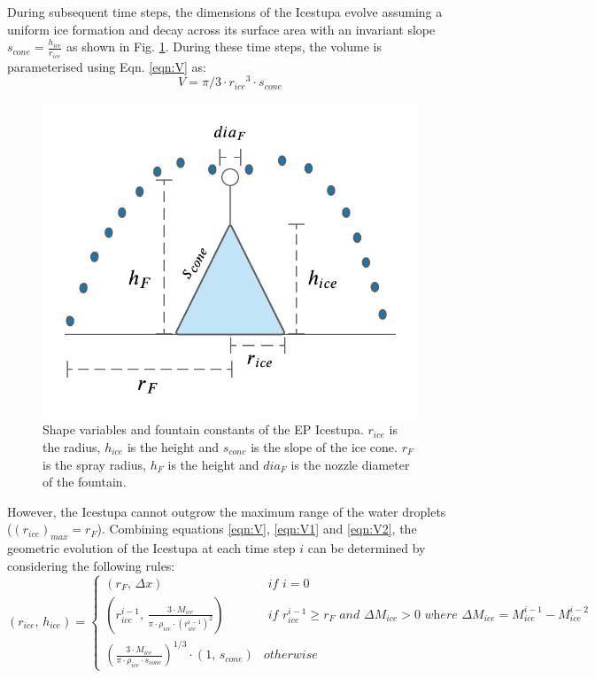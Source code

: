 \documentclass[utf8]{frontiersSCNS} %
\begin{document}
During subsequent time steps, the dimensions of the Icestupa evolve assuming a uniform ice formation and decay across
its surface area with an invariant slope $s_{cone} = \frac{h_{ice}}{r_{ice}}$ as shown in Fig.  \ref{fig:shape}.  During
these time steps, the volume is parameterised using Eqn. \ref{eqn:V} as:\begin{equation} V = \pi/3 \cdot {r_{ice}}^3
  \cdot s_{cone} \label{eqn:V2} \end{equation} \begin{figure} \begin{center} \includegraphics[width=10
cm]{Figures/Figure_5.jpg} \end{center} \caption{Shape variables and fountain constants of the EP Icestupa. $r_{ice}$ is
the radius, $h_{ice}$ is the height and $s_{cone}$ is the slope of the ice cone. $r_F$ is the spray radius, $h_F$ is the
height and $dia_F$ is the nozzle diameter of the fountain.} \label{fig:shape} \end{figure}However, the Icestupa cannot
outgrow the maximum range of the water droplets ($(r_{ice})_{max} = r_{F}$). Combining equations \ref{eqn:V},
\ref{eqn:V1} and \ref{eqn:V2}, the geometric evolution of the Icestupa at each time step $i$ can be determined by
considering the following rules:
\begin{equation} (r_{ice},\, h_{ice}) = \left\{ \begin{array}{ll} (r_F ,\, \Delta x) & \textit{ if } i=0\\
    (r_{ice}^{i-1},\, \frac{3 \cdot M_{ice}}{\pi \cdot \rho_{ice} \cdot {(r_{ice}^{i-1})}^2}) & \textit{ if }
    r_{ice}^{i-1} \geq r_{F} \textit{ and } \Delta M_{ice} > 0 \textit{ where } \Delta M_{ice} = M_{ice}^{i-1} -
    M_{ice}^{i-2}\\ (\frac{3 \cdot M_{ice}}{\pi \cdot \rho_{ice} \cdot s_{cone}})^{1/3} \cdot (1,\,  s_{cone}) &
otherwise \end{array} \right.  \label{eqn:A2} \end{equation}
\end{document}
